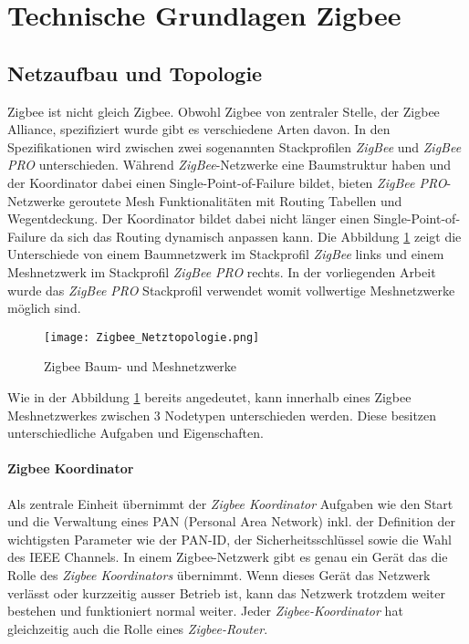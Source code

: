 \clearpage
\section{Technische Grundlagen Zigbee}\label{sec:TechnischeGrundlagenZigbee}

\subsection{Netzaufbau und Topologie}\label{subsec:NetzaufbauundTopologie}

Zigbee ist nicht gleich Zigbee. Obwohl Zigbee von zentraler Stelle, der Zigbee Alliance, spezifiziert wurde gibt es verschiedene Arten davon. In den Spezifikationen wird zwischen zwei sogenannten Stackprofilen \textit{ZigBee} und \textit{ZigBee PRO} unterschieden.
Während \textit{ZigBee}-Netzwerke eine Baumstruktur haben und der Koordinator dabei einen Single-Point-of-Failure bildet, bieten \textit{ZigBee PRO}-Netzwerke geroutete Mesh Funktionalitäten mit Routing Tabellen und Wegentdeckung. Der Koordinator bildet dabei nicht länger einen Single-Point-of-Failure da sich das Routing dynamisch anpassen kann.
Die Abbildung \ref{fig:NetzwerktopologienZigbee} zeigt die Unterschiede von einem Baumnetzwerk im Stackprofil \textit{ZigBee} links und einem Meshnetzwerk im Stackprofil \textit{ZigBee PRO} rechts.
In der vorliegenden Arbeit wurde das \textit{ZigBee PRO} Stackprofil verwendet womit vollwertige Meshnetzwerke möglich sind.

\begin{figure}[h]
	\centering
	\texttt{[image: Zigbee\_Netztopologie.png]}
	\caption{Zigbee Baum- und Meshnetzwerke \cite[S.~221]{markus_krause_rainer_konrad_zigbee_2014}}	\label{fig:NetzwerktopologienZigbee}
\end{figure}

Wie in der Abbildung \ref{fig:NetzwerktopologienZigbee} bereits angedeutet, kann innerhalb eines Zigbee Meshnetzwerkes zwischen 3 Nodetypen unterschieden werden. Diese besitzen unterschiedliche Aufgaben und Eigenschaften.

\paragraph{Zigbee Koordinator}\label{par:ZigbeeKoordinator}
Als zentrale Einheit übernimmt der \textit{Zigbee Koordinator} Aufgaben wie den Start und die Verwaltung eines PAN (Personal Area Network) inkl. der Definition der wichtigsten Parameter wie der PAN-ID, der Sicherheitsschlüssel sowie die Wahl des IEEE Channels.
In einem Zigbee-Netzwerk gibt es genau ein Gerät das die Rolle des \textit{Zigbee Koordinators} übernimmt. Wenn dieses Gerät das Netzwerk verlässt oder kurzzeitig ausser Betrieb ist, kann das Netzwerk trotzdem weiter bestehen und funktioniert normal weiter.
Jeder \textit{Zigbee-Koordinator} hat gleichzeitig auch die Rolle eines \textit{Zigbee-Router}.


